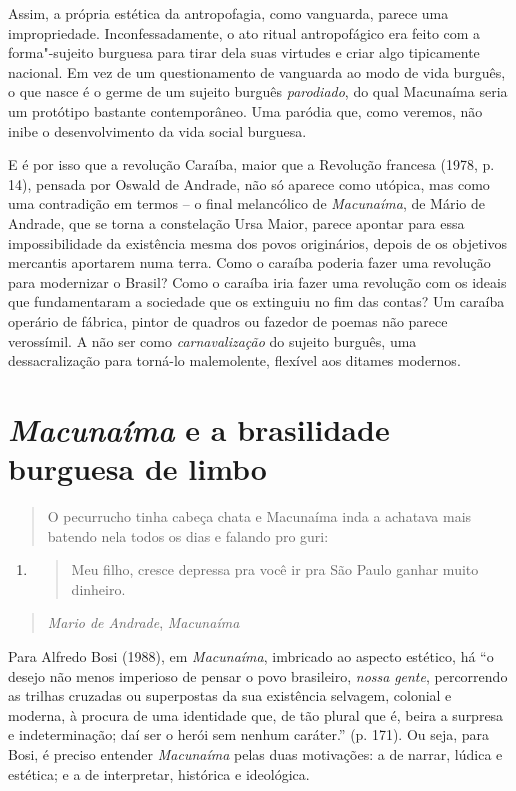 Assim, a própria estética da antropofagia, como vanguarda, parece uma
impropriedade. Inconfessadamente, o ato ritual antropofágico era feito
com a forma"-sujeito burguesa para tirar dela suas virtudes e criar algo
tipicamente nacional. Em vez de um questionamento de vanguarda ao modo
de vida burguês, o que nasce é o germe de um sujeito burguês
\emph{parodiado}, do qual Macunaíma seria um protótipo bastante
contemporâneo. Uma paródia que, como veremos, não inibe o
desenvolvimento da vida social burguesa.

E é por isso que a revolução Caraíba, maior que a Revolução francesa
(1978, p. 14), pensada por Oswald de Andrade, não só aparece como
utópica, mas como uma contradição em termos -- o final melancólico de
\emph{Macunaíma}, de Mário de Andrade, que se torna a constelação Ursa
Maior, parece apontar para essa impossibilidade da existência mesma dos
povos originários, depois de os objetivos mercantis aportarem numa
terra. Como o caraíba poderia fazer uma revolução para modernizar o
Brasil? Como o caraíba iria fazer uma revolução com os ideais que
fundamentaram a sociedade que os extinguiu no fim das contas? Um caraíba
operário de fábrica, pintor de quadros ou fazedor de poemas não parece
verossímil. A não ser como \emph{carnavalização} do sujeito burguês, uma
dessacralização para torná-lo malemolente, flexível aos ditames
modernos.

\section{\emph{Macunaíma} e a brasilidade burguesa de limbo}

\begin{quote}
O pecurrucho tinha cabeça chata e Macunaíma inda a achatava mais batendo
nela todos os dias e falando pro guri:
\end{quote}

\begin{enumerate}
\item
  \begin{quote}
  Meu filho, cresce depressa pra você ir pra São Paulo ganhar muito
  dinheiro.
  \end{quote}
\end{enumerate}

\begin{quote}
\emph{Mario de Andrade}, \emph{Macunaíma}
\end{quote}

Para Alfredo Bosi (1988), em \emph{Macunaíma}, imbricado ao aspecto
estético, há ``o desejo não menos imperioso de pensar o povo brasileiro,
\emph{nossa} \emph{gente}, percorrendo as trilhas cruzadas ou
superpostas da sua existência selvagem, colonial e moderna, à procura de
uma identidade que, de tão plural que é, beira a surpresa e
indeterminação; daí ser o herói sem nenhum caráter.'' (p. 171). Ou seja,
para Bosi, é preciso entender \emph{Macunaíma} pelas duas motivações: a
de narrar, lúdica e estética; e a de interpretar, histórica e
ideológica.

